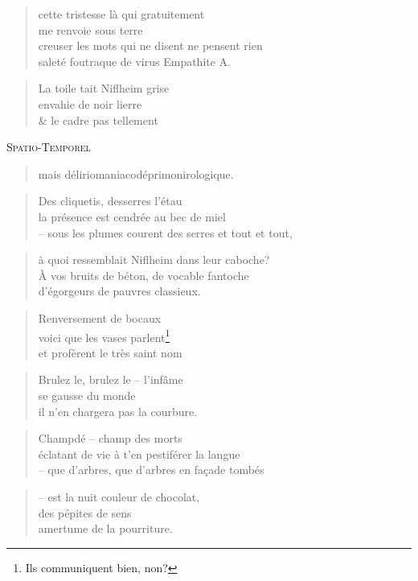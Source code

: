   \begin{verse}
    cette tristesse là qui gratuitement\\
    me renvoie sous terre\\
    creuser les mots qui ne disent ne pensent rien\\
    saleté foutraque de virus Empathite A.
  \end{verse}
  \begin{verse}
    La toile tait Niflheim grise\\
    envahie de noir lierre\\
    \& le cadre pas tellement
  \end{verse}
  \begin{center}
    \textsc{Spatio-Temporel}
  \end{center}
  \begin{verse}
    mais déliriomaniacodéprimonirologique.
  \end{verse}
  \begin{verse}
    Des cliquetis, desserres l’étau\\
    la présence est cendrée au bec de miel\\
    -- sous les plumes courent des serres et tout et tout,
  \end{verse}
  \begin{verse}
    à quoi ressemblait Niflheim dans leur caboche?\\
    À vos bruits de béton, de vocable fantoche\\
    d’égorgeurs de pauvres classieux.
  \end{verse}
  \begin{verse}
    Renversement de bocaux\\
    voici que les vases parlent\footnote{Ils communiquent bien, non?}\\
    et profèrent le très saint nom
  \end{verse}
  \begin{center}
  \end{center}
  \begin{verse}
    Brulez le, brulez le -- l’infâme\\
    se gausse du monde\\
    il n’en chargera pas la courbure.
  \end{verse}
  \begin{verse}
    Champdé -- champ des morts\\
    éclatant de vie à t’en pestiférer la langue\\
    -- que d’arbres, que d’arbres en façade tombés
  \end{verse}
  \begin{verse}
    -- est la nuit couleur de chocolat,\\
    des pépites de sens\\
    amertume de la pourriture.
  \end{verse}

